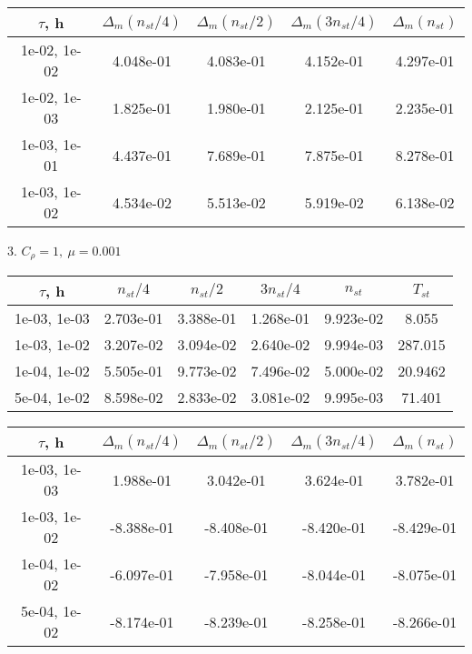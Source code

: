\begin{center}
	\begin{tabular}{ |c|c|c|c|c| } 
		\hline
		$\tau$, h & $\Delta_m (n_{st}/ 4)$ & $\Delta_m (n_{st}/ 2)$ & $\Delta_m (3n_{st}/ 4)$ & $\Delta_m (n_{st})$ \\ 
		\hline
		1e-02, 1e-02 & 4.048e-01 & 4.083e-01 & 4.152e-01 & 4.297e-01 \\ 
		\hline
		1e-02, 1e-03 & 1.825e-01 & 1.980e-01 & 2.125e-01 & 2.235e-01 \\ 
		\hline
		1e-03, 1e-01 & 4.437e-01 & 7.689e-01 & 7.875e-01 & 8.278e-01 \\ 
		\hline
		1e-03, 1e-02 & 4.534e-02 & 5.513e-02 & 5.919e-02 & 6.138e-02 \\ 
		\hline
	\end{tabular}
\end{center}

3. $C_{\rho} = 1, \ \mu = 0.001$
\begin{center}
	\begin{tabular}{ |c|c|c|c|c|c| } 
		\hline
		$\tau$, h & $n_{st}/ 4$ & $n_{st}/ 2$ & $3n_{st}/ 4$ & $n_{st}$ & $T_{st}$ \\ 
		\hline
		1e-03, 1e-03 & 2.703e-01 & 3.388e-01 & 1.268e-01 & 9.923e-02 & 8.055\\ 
		\hline
		1e-03, 1e-02 & 3.207e-02 & 3.094e-02 & 2.640e-02 & 9.994e-03 & 287.015\\ 
		\hline
		1e-04, 1e-02 & 5.505e-01 & 9.773e-02 & 7.496e-02 & 5.000e-02 & 20.9462\\ 
		\hline
		5e-04, 1e-02 & 8.598e-02 & 2.833e-02 & 3.081e-02 & 9.995e-03 & 71.401\\ 
		\hline
	\end{tabular}
\end{center}

\begin{center}
	\begin{tabular}{ |c|c|c|c|c| } 
		\hline
		$\tau$, h & $\Delta_m (n_{st}/ 4)$ & $\Delta_m (n_{st}/ 2)$ & $\Delta_m (3n_{st}/ 4)$ & $\Delta_m (n_{st})$ \\ 
		\hline
		1e-03, 1e-03 & 1.988e-01 & 3.042e-01 & 3.624e-01 & 3.782e-01 \\ 
		\hline
		1e-03, 1e-02 & -8.388e-01 & -8.408e-01 & -8.420e-01 & -8.429e-01 \\ 
		\hline
		1e-04, 1e-02 & -6.097e-01 & -7.958e-01 & -8.044e-01 & -8.075e-01 \\ 
		\hline
		5e-04, 1e-02 & -8.174e-01 & -8.239e-01 & -8.258e-01 & -8.266e-01 \\ 
		\hline
	\end{tabular}
\end{center}

